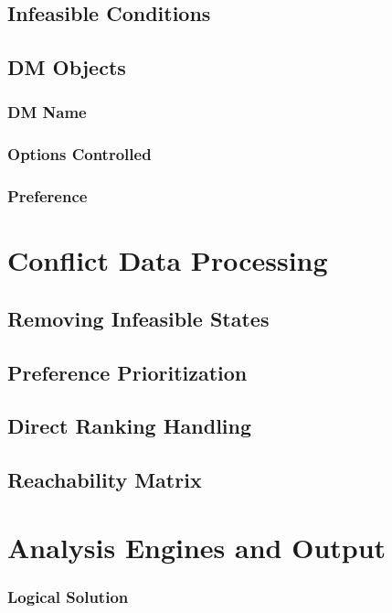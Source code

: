 \documentclass[letterpaper,12pt,titlepage,oneside,final]{book}
\begin{document}
\subsection{Infeasible Conditions}

\subsection{DM Objects}

\subsubsection{DM Name}

\subsubsection{Options Controlled}

\subsubsection{Preference}


\section{Conflict Data Processing}

\subsection{Removing Infeasible States}

\subsection{Preference Prioritization}

\subsection{Direct Ranking Handling}


\subsection{Reachability Matrix}

\section{Analysis Engines and Output}
\subsubsection{Logical Solution}
\end{document}
